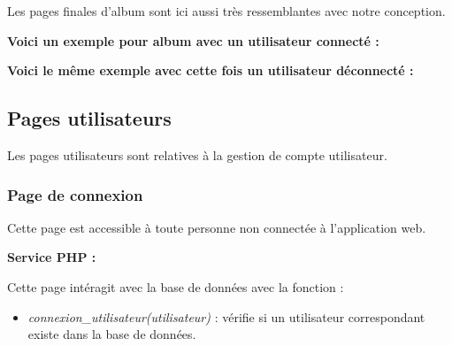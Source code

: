         \clearpage
        
			\begin{paragraphe}
                Les pages finales d'album sont ici aussi très ressemblantes avec notre conception.
			\end{paragraphe}

			\begin{paragraphe}
                \textbf{Voici un exemple pour album avec un utilisateur connecté :}
			\end{paragraphe}
            

			\begin{paragraphe}
                \textbf{Voici le même exemple avec cette fois un utilisateur déconnecté :}
			\end{paragraphe}
            

	\clearpage

	\subsection{Pages utilisateurs}
      \begin{paragraphe}
            Les pages utilisateurs sont relatives à la gestion de compte utilisateur.
        \end{paragraphe}

		\subsubsection{Page de connexion}

			\begin{paragraphe}
				Cette page est accessible à toute personne non connectée à l'application web.
			\end{paragraphe}

			\begin{paragraphe}
				\textbf{Service PHP :}
			\end{paragraphe}

			\begin{paragraphe}
			    Cette page intéragit avec la base de données avec la fonction :
				\begin{itemize}
					\item \emph{connexion\_utilisateur(utilisateur)} : vérifie si un utilisateur correspondant existe dans la base de données.
				\end{itemize}
			\end{paragraphe}

